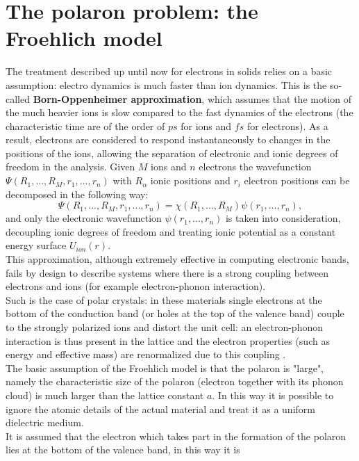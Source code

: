 \documentclass[12pt, a4paper]{report}
\numberwithin{equation}{section}
\begin{document}
\section{The polaron problem: the Froehlich model}
The treatment described up until now for electrons in solids relies on a basic assumption: electro dynamics is much faster than ion 
dynamics. This is the so-called \textbf{Born-Oppenheimer approximation}, which assumes that the motion of the much heavier ions is 
slow compared to the fast dynamics of the electrons (the characteristic time are of the order of $ps$ for ions and $fs$ for 
electrons). As a result, electrons are considered to respond instantaneously to changes in the positions of the ions, allowing 
the separation of electronic and ionic degrees of freedom in the analysis. Given $M$ ions and $n$ electrons the wavefunction 
$\Psi(R_1,...,R_M,r_1,...,r_n)$ with $R_\alpha$ ionic positions and $r_i$ electron positions can be decomposed in the following way:
\begin{equation}
    \Psi(R_1,...,R_M,r_1,...,r_n)=\chi(R_1,...,R_M)\psi(r_1,...,r_n),
\end{equation}
and only the electronic wavefunction $\psi(r_1,...,r_n)$ is taken into consideration, decoupling ionic degrees of freedom and treating 
ionic potential as a constant energy surface $U_{ion}(r)$.\\
This approximation, although extremely effective in computing electronic bands, fails by design to describe systems where there is a 
strong coupling between electrons and ions (for example electron-phonon interaction).\\
Such is the case of polar crystals: in these materials single electrons at the bottom of the conduction band (or holes at the top of 
the valence band) couple to the strongly polarized ions and distort the unit cell: an electron-phonon interaction is thus present 
in the lattice and the electron properties (such as energy and effective mass) are renormalized due to this coupling \cite{frohlich1954electrons}.\\
The basic assumption of the Froehlich model is that the polaron is "large", namely the characteristic size of the polaron (electron together 
with its phonon cloud) is much larger than the lattice constant $a$. In this way it is possible to ignore the atomic details of the actual 
material and treat it as a uniform dielectric medium.\\
It is assumed that the electron which takes part in the formation of the polaron lies at the bottom of the valence band, in this way it is 
\end{document}
